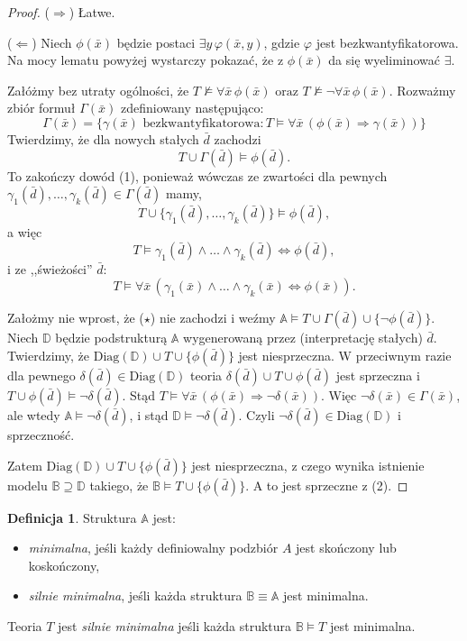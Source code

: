 \documentclass{article}
\newcommand{\A}{\mathbb{A}}
\newcommand{\B}{\mathbb{B}}
\newcommand{\D}{\mathbb{D}}
\theoremstyle{plain}
\theoremstyle{definition}
\newtheorem{df}[thm]{Definicja}
\theoremstyle{remark}
\newcommand{\Diag}{\text{Diag}}
\begin{document}
\begin{proof}
	($\Rightarrow$) Łatwe.

	($\Leftarrow$)
	Niech $\phi(\bar{x})$ będzie postaci $\exists y \, \varphi(\bar{x}, y)$,
	gdzie $\varphi$ jest bezkwantyfikatorowa. Na mocy lematu powyżej
	wystarczy pokazać, że z $\phi(\bar{x})$ da się wyeliminować $\exists$.

	Załóżmy bez utraty ogólności, że
	$T \not\models \forall \bar{x} \, \phi(\bar{x}) \text{ oraz }
	T \not\models \neg\forall \bar{x} \, \phi(\bar{x})$. Rozważmy zbiór
	formuł $\Gamma(\bar{x})$ zdefiniowany następująco:
	$$\Gamma(\bar{x}) = \{\gamma(\bar{x}) \text{ bezkwantyfikatorowa}
	\colon T \models \forall \bar{x} \, (\phi(\bar{x}) \Rightarrow
	\gamma(\bar{x}))\}$$
	Twierdzimy, że dla nowych stałych $\bar{d}$ zachodzi
	\[
		\tag{$\star$}
		T \cup \Gamma(\bar{d}) \models \phi(\bar{d}).
	\]
	To zakończy dowód (1), ponieważ wówczas ze zwartości dla pewnych \\
	$\gamma_1(\bar{d}), \ldots, \gamma_k(\bar{d}) \in \Gamma(\bar{d})$ mamy,
	$$T \cup \{\gamma_1(\bar{d}), \ldots, \gamma_k(\bar{d})\}
	\models \phi(\bar{d}),$$
	a więc
	$$T \models \gamma_1(\bar{d}) \wedge \ldots \wedge \gamma_k(\bar{d})
	 \iff \phi(\bar{d}),$$
	i ze ,,świeżości'' $\bar{d}$:
	$$T \models \forall \bar{x} \, (\gamma_1(\bar{x}) \wedge \ldots \wedge
	\gamma_k(\bar{x}) \iff \phi(\bar{x})).$$

	Założmy nie wprost, że ($\star$) nie zachodzi i weźmy
	$\A \models T \cup \Gamma(\bar{d}) \cup \{\neg\phi(\bar{d})\}$.
	Niech $\D$ będzie podstrukturą $\A$ wygenerowaną przez (interpretację
	stałych) $\bar{d}$. Twierdzimy, że
	$\Diag(\D) \cup T \cup \{\phi(\bar{d})\}$
	jest niesprzeczna. W przeciwnym razie dla pewnego
	$\delta(\bar{d}) \in \Diag(\D)$ teoria $\delta(\bar{d}) \cup T \cup
	\phi(\bar{d})$ jest sprzeczna i $T \cup \phi(\bar{d}) \models
	\neg \delta(\bar{d})$. Stąd $T \models \forall \bar{x} \,
	(\phi(\bar{x}) \Rightarrow \neg \delta(\bar{x}))$. Więc
	$\neg \delta(\bar{x}) \in \Gamma(\bar{x})$, ale wtedy
	$\A \models \neg \delta(\bar{d})$, i stąd
	$\D \models \neg \delta(\bar{d})$.
	Czyli $\neg\delta(\bar{d}) \in \Diag(\D)$ i sprzeczność.

	Zatem $\Diag(\D) \cup T \cup \{\phi(\bar{d})\}$ jest niesprzeczna,
	z czego wynika istnienie modelu $\B \supseteq \D$ takiego, że
	$\B \models T \cup \{\phi(\bar{d})\}$. A to jest sprzeczne z (2).
\end{proof}

\begin{df}
	Struktura $\A$ jest:
	\begin{itemize}
		\item \textit{minimalna}, jeśli każdy definiowalny podzbiór $A$
			jest skończony lub koskończony,
		\item \textit{silnie minimalna}, jeśli każda struktura $\B
			\equiv \A$ jest minimalna.
	\end{itemize}

	Teoria $T$ jest \textit{silnie minimalna} jeśli każda struktura $\B
	\models T$ jest minimalna.
\end{df}
\end{document}
